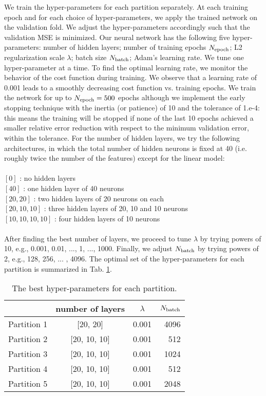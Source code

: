 \documentclass[fleqn, usenatbib]{mnras}
\begin{document}
We train the hyper-parameters for each partition separately. At each training epoch and for each choice of hyper-parameters, we apply the trained network on the validation fold. We adjust the hyper-parameters accordingly such that the validation MSE is minimized. Our neural network has the following five hyper-parameters: number of hidden layers; number of training epochs $N_{{\rm epoch}}$; L2 regularization scale $\lambda$; batch size $N_{{\rm batch}}$; Adam's learning rate. We tune one hyper-parameter at a time. To find the optimal learning rate, we monitor the behavior of the cost function during training. We observe that a learning rate of 0.001 leads to a smoothly decreasing cost function vs. training epochs. We train the network for up to $N_{\rm epoch} = 500$ epochs although we implement the early stopping technique with the inertia (or patience) of 10 and the tolerance of 1.e-4: this means the training will be stopped if none of the last 10 epochs achieved a smaller relative error reduction with respect to the minimum validation error, within the tolerance. For the number of hidden layers, we try the following architectures, in which the total number of hidden neurons is fixed at 40 (i.e. roughly twice the number of the features) except for the linear model:\\~\\
%
%
$[0]$  : no hidden layers \\
$[40]$ : one hidden layer of 40 neurons \\
$[20, 20]$ : two hidden layers of 20 neurons on each \\
$[20, 10, 10]$ : three hidden layers of 20, 10 and 10 neurons \\
$[10, 10, 10, 10]$ : four hidden layers of 10 neurons\\~\\
After finding the best number of layers, we proceed to tune $\lambda$ by trying  powers of 10, e.g., 0.001, 0.01, ..., 1, ..., 1000. Finally, we adjust $N_{\rm batch}$ by trying powers of 2, e.g., 128, 256, ... , 4096. The optimal set of the hyper-parameters for each partition is summarized in Tab. \ref{tab:hparams}.\\

\begin{table}
	\centering
	\caption{The best hyper-parameters for each partition.}
	\label{tab:hparams}
	\begin{tabular}{lccr} %
	    \hline
		\hline
		 & number of layers & $\lambda$ & $N_{\rm batch}$ \\
		\hline
		Partition 1 & [20, 20] & 0.001 & 4096\\
		Partition 2 & [20, 10, 10] & 0.001 & 512\\
		Partition 3 & [20, 10, 10] & 0.001 & 1024 \\
		Partition 4 & [20, 10, 10] & 0.001 & 512 \\
		Partition 5 &  [20, 10, 10] & 0.001 & 2048\\
		\hline
		\hline
	\end{tabular}
\end{table}
\end{document}
